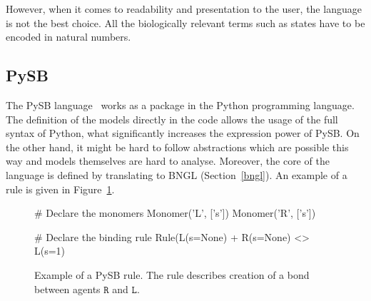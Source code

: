 \documentclass[11pt,a4paper]{report}
\begin{document}
However, when it comes to readability and presentation to the user, the language is not the best choice. All the biologically relevant terms such as states have to be encoded in natural numbers.

\subsection{PySB}

The PySB language~\cite{Lopez646} works as a package in the Python programming language. The definition of the models directly in the code allows the usage of the full syntax of Python, what significantly increases the expression power of PySB. On the other hand, it might be hard to follow abstractions which are possible this way and models themselves are hard to analyse. Moreover, the core of the language is defined by translating to BNGL (Section~\ref{bngl}). An example of a rule is given in Figure~\ref{pysb_rule}.

\begin{figure}[!h]
\begin{center}
\begin{python}
# Declare the monomers
Monomer('L', ['s'])
Monomer('R', ['s'])

# Declare the binding rule
Rule(L(s=None) + R(s=None) <> L(s=1) %
\end{python}
\end{center}
\caption{Example of a PySB rule. The rule describes creation of a bond between agents $\mathtt{R}$ and $\mathtt{L}$.}\label{PySB-rule}\label{pysb_rule}
\end{figure}
\end{document}
